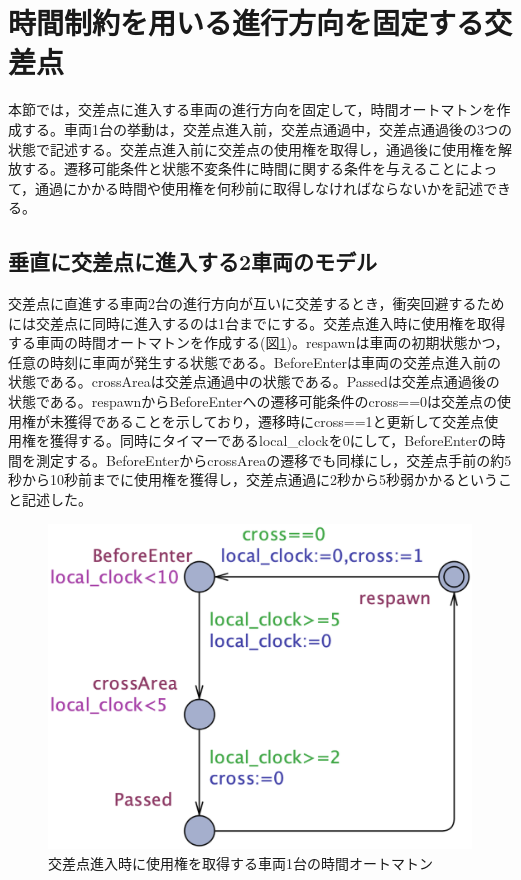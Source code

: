 \documentclass{tpu-sotu}
\begin{document}
	\section{時間制約を用いる進行方向を固定する交差点}
	本節では，交差点に進入する車両の進行方向を固定して，時間オートマトンを作成する。車両1台の挙動は，交差点進入前，交差点通過中，交差点通過後の3つの状態で記述する。交差点進入前に交差点の使用権を取得し，通過後に使用権を解放する。遷移可能条件と状態不変条件に時間に関する条件を与えることによって，通過にかかる時間や使用権を何秒前に取得しなければならないかを記述できる。
	\subsection{垂直に交差点に進入する2車両のモデル}
	交差点に直進する車両2台の進行方向が互いに交差するとき，衝突回避するためには交差点に同時に進入するのは1台までにする。交差点進入時に使用権を取得する車両の時間オートマトンを作成する(図\ref{Perpendicular})。respawnは車両の初期状態かつ，任意の時刻に車両が発生する状態である。BeforeEnterは車両の交差点進入前の状態である。crossAreaは交差点通過中の状態である。Passedは交差点通過後の状態である。respawnからBeforeEnterへの遷移可能条件のcross==0は交差点の使用権が未獲得であることを示しており，遷移時にcross==1と更新して交差点使用権を獲得する。同時にタイマーであるlocal\_clockを0にして，BeforeEnterの時間を測定する。BeforeEnterからcrossAreaの遷移でも同様にし，交差点手前の約5秒から10秒前までに使用権を獲得し，交差点通過に2秒から5秒弱かかるということ記述した。
	\begin{figure}[htbp]
	\centering
	\includegraphics[width=125mm]{Perpendicular.png}
	\caption{交差点進入時に使用権を取得する車両1台の時間オートマトン}
	\label{Perpendicular}
	\end{figure}
	
\end{document}
